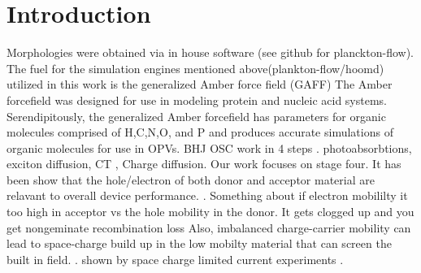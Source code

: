 \chapter{Introduction}
Morphologies were obtained via in house software (see github for planckton-flow).
The fuel for the simulation engines mentioned above(plankton-flow/hoomd) utilized in this work is the generalized Amber force field (GAFF) \cite{Wang2004a}
The Amber forcefield was designed for use in modeling protein and nucleic acid systems. 
Serendipitously, the generalized Amber forcefield has parameters for organic molecules comprised of H,C,N,O, and P and
produces accurate simulations of organic molecules for use in OPVs. 
BHJ OSC work in 4 steps . photoabsorbtions, exciton diffusion, CT , Charge diffusion. \citet{Fusella2019}
Our work focuses on stage four. It has been show that the hole/electron of both donor and 
acceptor material are relavant to overall device performance. \cite{Wang2019e}. Something about if electron mobililty it too high in acceptor vs the 
hole mobility in the donor. It gets clogged up and you get nongeminate recombination loss  Also, imbalanced charge-carrier
mobility can lead to space-charge build up in the low mobilty material that can screen the built in field.
\cite{Bartelt2015}. shown by space charge limited current experiments  \cite{Small2013}.

